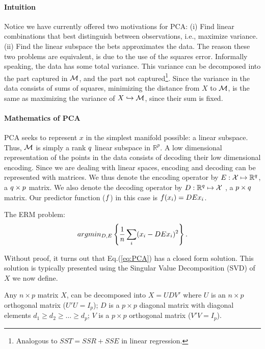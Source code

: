 \paragraph{Intuition}
Notice we have currently offered two motivations for PCA: 
(i) Find linear combinations that best distinguish between observations, i.e., maximize variance. 
(ii) Find the linear subspace the bets approximates the data.
The reason these two problems are equivalent, is due to the use of the squares error.
Informally speaking, the data has some total variance. This variance can be decomposed into the part captured in $\mathcal{M}$, and the part not captured\footnote{Analogous to $SST=SSR+SSE$ in linear regression.}. 
Since the variance in the data consists of sums of squares, minimizing the distance from $X$ to $\mathcal{M}$, is the same as maximizing the variance of $X \hookrightarrow \mathcal{M}$, since their sum is fixed.


\paragraph{Mathematics of PCA}

PCA seeks to represent $x$ in the simplest manifold possible: a linear subspace. Thus, $\mathcal{M}$ is simply a rank $q$ linear subspace in $\mathbb{R}^p$.
A low dimensional representation of the points in the data consists of decoding their low dimensional encoding. 
Since we are dealing with linear spaces, encoding and decoding can be represented with matrices. 
We thus denote the encoding operator by $E:\mathcal{X} \mapsto \mathbb{R}^q$, a $q \times p$ matrix.
We also denote the decoding operator by $D:\mathbb{R}^q \mapsto \mathcal{X}$ , a $p \times q$ matrix. 
Our predictor function ($f$) in this case is $f(x_i)=DE x_i$.
 
The ERM problem:
\begin{align}
\label{eq:PCA}
	argmin_{D,E}\left\{ \frac{1}{n}\sum_i (x_i-DE x_i)^2 \right\} .
\end{align}

Without proof, it turns out that Eq.(\ref{eq:PCA}) has a closed form solution. 
This solution is typically presented using the Singular Value Decomposition (SVD) of $X$ we now define.
\begin{definition}[SVD]
Any $n \times p$ matrix $X$, can be decomposed into $X=UDV'$ where 
$U$ is an $n \times p$ orthogonal matrix ($U'U=I_p$); 
$D$ is a $p \times p$ diagonal matrix with diagonal elements $d_1 \geq d_2 \geq \dots \geq d_p$;
$V$ is a $p \times p$ orthogonal matrix ($V'V=I_p$).
\end{definition}

